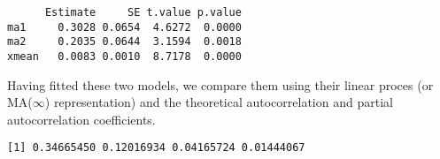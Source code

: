 \documentclass[]{book}
\newenvironment{Shaded}{\begin{snugshade}}{\end{snugshade}}
\newcommand{\CommentTok}[1]{\textcolor[rgb]{0.56,0.35,0.01}{\textit{#1}}}
\newcommand{\DataTypeTok}[1]{\textcolor[rgb]{0.13,0.29,0.53}{#1}}
\newcommand{\DecValTok}[1]{\textcolor[rgb]{0.00,0.00,0.81}{#1}}
\newcommand{\KeywordTok}[1]{\textcolor[rgb]{0.13,0.29,0.53}{\textbf{#1}}}
\newcommand{\NormalTok}[1]{#1}
\newcommand{\OperatorTok}[1]{\textcolor[rgb]{0.81,0.36,0.00}{\textbf{#1}}}
\begin{document}
\begin{verbatim}
      Estimate     SE t.value p.value
ma1     0.3028 0.0654  4.6272  0.0000
ma2     0.2035 0.0644  3.1594  0.0018
xmean   0.0083 0.0010  8.7178  0.0000
\end{verbatim}

Having fitted these two models, we compare them using their linear
proces (or MA(\(\infty\)) representation) and the theoretical
autocorrelation and partial autocorrelation coefficients.

\begin{Shaded}
\end{Shaded}

\begin{verbatim}
[1] 0.34665450 0.12016934 0.04165724 0.01444067
\end{verbatim}
\end{document}
